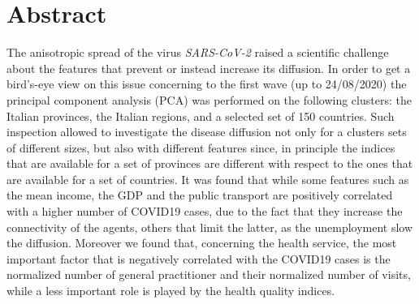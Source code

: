\documentclass[
12pt, %
a4paper, %
oneside, %
headinclude,footinclude, %
BCOR5mm, %
]{scrartcl}
\begin{document}
\section*{Abstract} %
The anisotropic spread of the virus \textit{SARS-CoV-2} raised a scientific challenge about the features that prevent or instead increase its diffusion. In order to get a bird's-eye view on this issue concerning to the first wave (up to 24/08/2020) the principal component analysis (PCA) was performed on the following clusters: the Italian provinces, the Italian regions, and a selected set of 150 countries. Such inspection allowed to investigate the disease diffusion not only for a clusters sets of different sizes, but also with different features since, in principle the indices that are available for a set of provinces are different with respect to the ones that are available for a set of countries. It was found that while some features such as the mean income, the GDP and the public transport are positively correlated with a higher number of COVID19 cases, due to the fact that they increase the connectivity of the agents, others that limit the latter, as the unemployment slow the diffusion. Moreover we found that, concerning the health service, the most important factor that is negatively correlated with the COVID19 cases is the normalized number of general practitioner and their normalized number of visits, while a less important role is played by the health quality indices.

\nocite{*}
\setcounter{tocdepth}{2} %

\tableofcontents %




\newpage %
\end{document}
